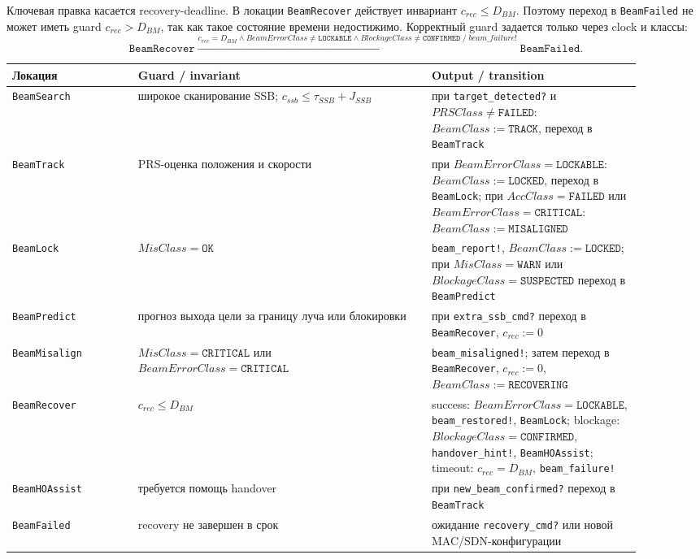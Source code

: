 \documentclass[10pt,a4paper]{article}
\newcommand{\code}[1]{\texttt{#1}}
\begin{document}
Ключевая правка касается recovery-deadline. В локации \code{BeamRecover} действует инвариант \(c_{rec}\le D_{BM}\). Поэтому переход в \code{BeamFailed} не может иметь guard \(c_{rec}>D_{BM}\), так как такое состояние времени недостижимо. Корректный guard задается только через clock и классы:
\begin{equation}
\code{BeamRecover}\xrightarrow{c_{rec}=D_{BM}\wedge BeamErrorClass\ne\code{LOCKABLE}\wedge BlockageClass\ne\code{CONFIRMED}\;/\;beam\_failure!}\code{BeamFailed}.
\end{equation}

\begin{longtable}{|p{0.18\linewidth}|p{0.42\linewidth}|p{0.30\linewidth}|}
\hline
Локация & Guard / invariant & Output / transition \\
\hline
\code{BeamSearch} & широкое сканирование SSB; \(c_{ssb}\le \tau_{SSB}+J_{SSB}\) & при \code{target\_detected?} и \(PRSClass\ne\code{FAILED}\): \(BeamClass:=\code{TRACK}\), переход в \code{BeamTrack} \\
\hline
\code{BeamTrack} & PRS-оценка положения и скорости & при \(BeamErrorClass=\code{LOCKABLE}\): \(BeamClass:=\code{LOCKED}\), переход в \code{BeamLock}; при \(AccClass=\code{FAILED}\) или \(BeamErrorClass=\code{CRITICAL}\): \(BeamClass:=\code{MISALIGNED}\) \\
\hline
\code{BeamLock} & \(MisClass=\code{OK}\) & \code{beam\_report!}, \(BeamClass:=\code{LOCKED}\); при \(MisClass=\code{WARN}\) или \(BlockageClass=\code{SUSPECTED}\) переход в \code{BeamPredict} \\
\hline
\code{BeamPredict} & прогноз выхода цели за границу луча или блокировки & при \code{extra\_ssb\_cmd?} переход в \code{BeamRecover}, \(c_{rec}:=0\) \\
\hline
\code{BeamMisalign} & \(MisClass=\code{CRITICAL}\) или \(BeamErrorClass=\code{CRITICAL}\) & \code{beam\_misaligned!}; затем переход в \code{BeamRecover}, \(c_{rec}:=0\), \(BeamClass:=\code{RECOVERING}\) \\
\hline
\code{BeamRecover} & \(c_{rec}\le D_{BM}\) & success: \(BeamErrorClass=\code{LOCKABLE}\), \code{beam\_restored!}, \code{BeamLock}; blockage: \(BlockageClass=\code{CONFIRMED}\), \code{handover\_hint!}, \code{BeamHOAssist}; timeout: \(c_{rec}=D_{BM}\), \code{beam\_failure!} \\
\hline
\code{BeamHOAssist} & требуется помощь handover & при \code{new\_beam\_confirmed?} переход в \code{BeamTrack} \\
\hline
\code{BeamFailed} & recovery не завершен в срок & ожидание \code{recovery\_cmd?} или новой MAC/SDN-конфигурации \\
\hline
\end{longtable}
\end{document}
